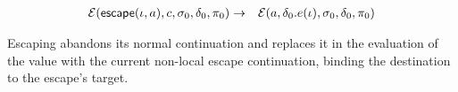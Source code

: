 \documentclass{article}
\begin{document}
\begin{eqnarray*}
\mathcal{E}(\mathsf{escape}(\iota, a), c, \sigma_0, \delta_0, \pi_0) & \to &
\mathcal{E}(a, \delta_0.e(\iota), \sigma_0, \delta_0, \pi_0)
\end{eqnarray*}

Escaping abandons its normal continuation and replaces it in the evaluation of
the value with the current non-local escape continuation, binding the
destination to the escape's target.
\end{document}
